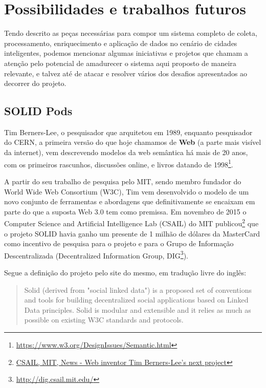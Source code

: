 \chapter{Possibilidades e trabalhos futuros}

Tendo descrito as peças necessárias para compor um sistema completo de coleta, processamento, enriquecimento e aplicação de dados no cenário de cidades inteligentes, podemos mencionar algumas iniciativas e projetos que chamam a atenção pelo potencial de amadurecer o sistema aqui proposto de maneira relevante, e talvez até de atacar e resolver vários dos desafios apresentados ao decorrer do projeto.

\section{SOLID Pods}

Tim Berners-Lee, o pesquisador que arquitetou em 1989, enquanto pesquisador do CERN, a primeira versão do que hoje chamamos de \textbf{Web} (a parte mais visível da internet), vem descrevendo modelos da web semântica há mais de 20 anos, com os primeiros rascunhos, discussões online, e livros \cite{berners2001weaving} datando de 1998\footnote{\url{https://www.w3.org/DesignIssues/Semantic.html}}.

A partir do seu trabalho de pesquisa pelo MIT, sendo membro fundador do World Wide Web Consortium (W3C), Tim vem desenvolvido o modelo de um novo conjunto de ferramentas e abordagens que definitivamente se encaixam em parte do que a suposta Web 3.0 tem como premissa. Em novembro de 2015 o Computer Science and Artificial Intelligence Lab (CSAIL) do MIT publicou\footnote{\href{https://www.csail.mit.edu/news/web-inventor-tim-berners-lees-next-project-platform-gives-users-control-their-data}{CSAIL, MIT, News - Web inventor Tim Berners-Lee's next project}} que o projeto SOLID havia ganho um presente de 1 milhão de dólares da MasterCard como incentivo de pesquisa para o projeto e para o Grupo de Informação Descentralizada (Decentralized Information Group, DIG\footnote{\url{http://dig.csail.mit.edu/}}).

Segue a definição do projeto pelo site do mesmo, em tradução livre do inglês:

\begin{quote}
    Solid (derived from "social linked data") is a proposed set of conventions and tools for building decentralized social applications based on Linked Data principles. Solid is modular and extensible and it relies as much as possible on existing W3C standards and protocols.
\end{quote}

